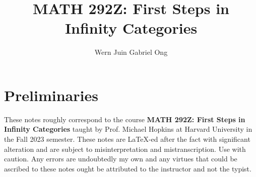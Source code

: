 \documentclass{amsart}
\theoremstyle{definition}
\numberwithin{equation}{section}
\begin{document}
\large
\title[Infinity Categories]{MATH 292Z: First Steps in Infinity Categories}
\author{Wern Juin Gabriel Ong}
\address{Bowdoin College, Brunswick, Maine 04011}
\maketitle
\section*{Preliminaries}
These notes roughly correspond to the course \textbf{MATH 292Z: First Steps in Infinity Categories} taught by Prof. Michael Hopkins at Harvard University in the Fall 2023 semester. These notes are \LaTeX-ed after the fact with significant alteration and are subject to misinterpretation and mistranscription. Use with caution. Any errors are undoubtedly my own and any virtues that could be ascribed to these notes ought be attributed to the instructor and not the typist. 
\tableofcontents
\end{document}
